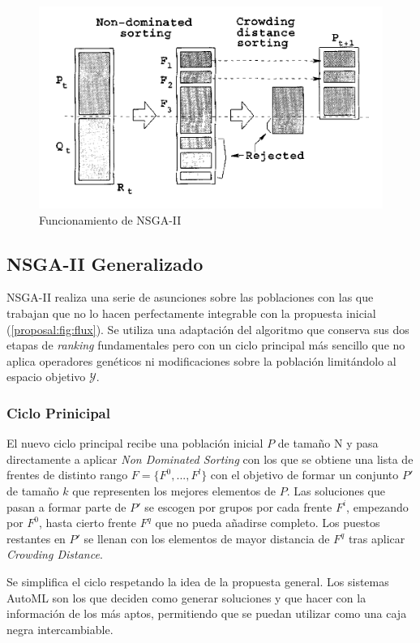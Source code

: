 \begin{figure}[ht]
    \centering
    \includegraphics[scale=0.5]{Pictures/nsga2.png}
    \caption{Funcionamiento de NSGA-II}
    \label{proposal:fig:nsga2}
\end{figure}

\subsection{NSGA-II Generalizado}

NSGA-II realiza una serie de asunciones sobre las poblaciones con las que trabajan que no lo hacen perfectamente integrable con la propuesta inicial (\ref{proposal:fig:flux}). Se utiliza una adaptaci\'on del algoritmo que conserva sus dos etapas de \textit{ranking} fundamentales pero con un ciclo principal m\'as sencillo que no aplica operadores gen\'eticos ni modificaciones sobre la poblaci\'on limit\'andolo al espacio objetivo $\mathcal{Y}$.

\subsubsection{Ciclo Prinicipal}
El nuevo ciclo principal recibe una poblaci\'on inicial $P$ de tama\~no N y pasa directamente a aplicar \textit{Non Dominated Sorting} con los que se obtiene una lista de frentes de distinto rango $F = \{F^0, ..., F^l\}$ con el objetivo de formar un conjunto $P'$ de tama\~no $k$ que representen los mejores elementos de $P$. Las soluciones que pasan a formar parte de $P'$ se escogen por grupos por cada frente $F^i$, empezando por $F^0$, hasta cierto frente $F^q$ que no pueda a\~nadirse completo. Los puestos restantes en $P'$ se llenan con los elementos de mayor distancia de $F^q$ tras aplicar \textit{Crowding Distance}.

Se simplifica el ciclo respetando la idea de la propuesta general.  Los sistemas AutoML son los que deciden como generar soluciones y que hacer con la informaci\'on de los m\'as aptos, permitiendo que se puedan utilizar como una caja negra intercambiable.
